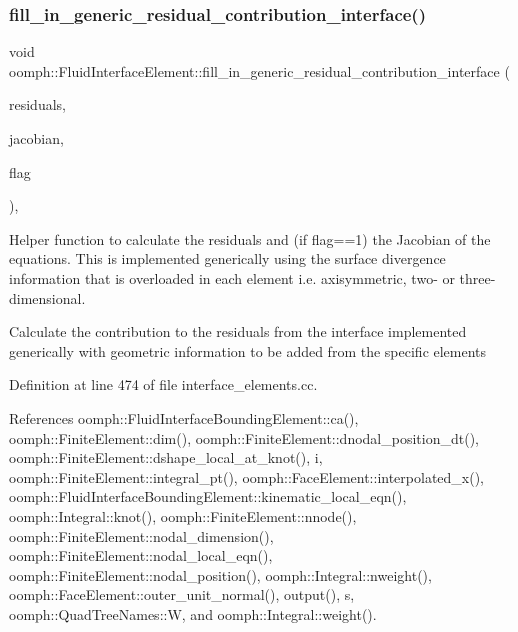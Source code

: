 \subsubsection{\texorpdfstring{fill\+\_\+in\+\_\+generic\+\_\+residual\+\_\+contribution\+\_\+interface()}{fill\_in\_generic\_residual\_contribution\_interface()}}
{\footnotesize\ttfamily void oomph\+::\+Fluid\+Interface\+Element\+::fill\+\_\+in\+\_\+generic\+\_\+residual\+\_\+contribution\+\_\+interface (\begin{DoxyParamCaption}\item[{\hyperlink{classoomph_1_1Vector}{Vector}$<$ double $>$ \&}]{residuals,  }\item[{\hyperlink{classoomph_1_1DenseMatrix}{Dense\+Matrix}$<$ double $>$ \&}]{jacobian,  }\item[{unsigned}]{flag }\end{DoxyParamCaption})\hspace{0.3cm}{\ttfamily [protected]}, {\ttfamily [virtual]}}



Helper function to calculate the residuals and (if flag==1) the Jacobian of the equations. This is implemented generically using the surface divergence information that is overloaded in each element i.\+e. axisymmetric, two-\/ or three-\/dimensional. 

Calculate the contribution to the residuals from the interface implemented generically with geometric information to be added from the specific elements 

Definition at line 474 of file interface\+\_\+elements.\+cc.



References oomph\+::\+Fluid\+Interface\+Bounding\+Element\+::ca(), oomph\+::\+Finite\+Element\+::dim(), oomph\+::\+Finite\+Element\+::dnodal\+\_\+position\+\_\+dt(), oomph\+::\+Finite\+Element\+::dshape\+\_\+local\+\_\+at\+\_\+knot(), i, oomph\+::\+Finite\+Element\+::integral\+\_\+pt(), oomph\+::\+Face\+Element\+::interpolated\+\_\+x(), oomph\+::\+Fluid\+Interface\+Bounding\+Element\+::kinematic\+\_\+local\+\_\+eqn(), oomph\+::\+Integral\+::knot(), oomph\+::\+Finite\+Element\+::nnode(), oomph\+::\+Finite\+Element\+::nodal\+\_\+dimension(), oomph\+::\+Finite\+Element\+::nodal\+\_\+local\+\_\+eqn(), oomph\+::\+Finite\+Element\+::nodal\+\_\+position(), oomph\+::\+Integral\+::nweight(), oomph\+::\+Face\+Element\+::outer\+\_\+unit\+\_\+normal(), output(), s, oomph\+::\+Quad\+Tree\+Names\+::W, and oomph\+::\+Integral\+::weight().

